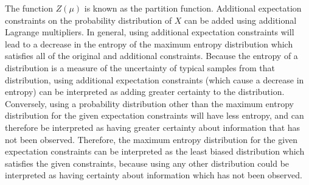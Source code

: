 The function $Z(\mu)$ is known as the partition function. Additional expectation constraints on the probability distribution of $X$ can be added using additional Lagrange multipliers. In general, using additional expectation constraints will lead to a decrease in the entropy of the maximum entropy distribution which satisfies all of the original and additional constraints. Because the entropy of a distribution is a measure of the uncertainty of typical samples from that distribution, using additional expectation constraints (which cause a decrease in entropy) can be interpreted as adding greater certainty to the distribution. Conversely, using a probability distribution other than the maximum entropy distribution for the given expectation constraints will have less entropy, and can therefore be interpreted as having greater certainty about information that has not been observed. Therefore, the maximum entropy distribution for the given expectation constraints can be interpreted as the least biased distribution which satisfies the given constraints, because using any other distribution could be interpreted as having certainty about information which has not been observed.
